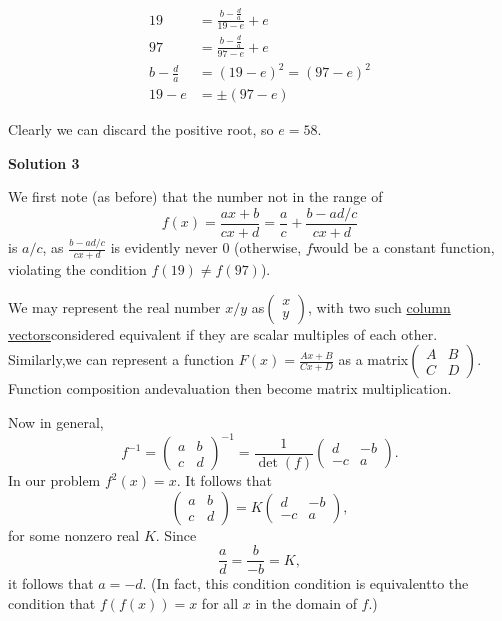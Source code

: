 \begin{enumerate}
 
 \begin{align*} 19 &= \frac{b - \frac da}{19 - e} + e\\ 97 &= \frac{b - \frac da}{97 - e} + e\\ b - \frac da &= (19 - e)^2 = (97 - e)^2\\ 19 - e &= \pm (97 - e) \end{align*}


 Clearly we can discard the positive root, so $e = 58$.

 



\textbf{Solution 3}

We first note (as before) that the number not in the range of
 \[f(x) = \frac{ax+b}{cx+ d} = \frac{a}{c} + \frac{b - ad/c}{cx+d}\]is $a/c$, as $\frac{b-ad/c}{cx+d}$ is evidently never 0 (otherwise, $f$would be a constant function, violating the condition $f(19) \neq f(97)$).

 We may represent the real number $x/y$ as$\begin{pmatrix}x \\ y\end{pmatrix}$, with two such \href{https://artofproblemsolving.com/wiki/index.php?title=Vector}{column vectors}considered equivalent if they are scalar multiples of each other.  Similarly,we can represent a function $F(x) = \frac{Ax + B}{Cx + D}$ as a matrix$\begin{pmatrix} A & B\\ C& D \end{pmatrix}$.  Function composition andevaluation then become matrix multiplication.

 Now in general,
 \[f^{-1} = \begin{pmatrix} a & b\\ c&d \end{pmatrix}^{-1} = \frac{1}{\det(f)} \begin{pmatrix} d & -b \\ -c & a \end{pmatrix} .\]In our problem $f^2(x) = x$.  It follows that
 \[\begin{pmatrix} a & b \\ c& d \end{pmatrix} = K \begin{pmatrix} d & -b \\ -c & a \end{pmatrix} ,\]for some nonzero real $K$.  Since
 \[\frac{a}{d} = \frac{b}{-b} = K,\]it follows that $a = -d$.  (In fact, this condition condition is equivalentto the condition that $f(f(x)) = x$ for all $x$ in the domain of $f$.)


\end{enumerate}
